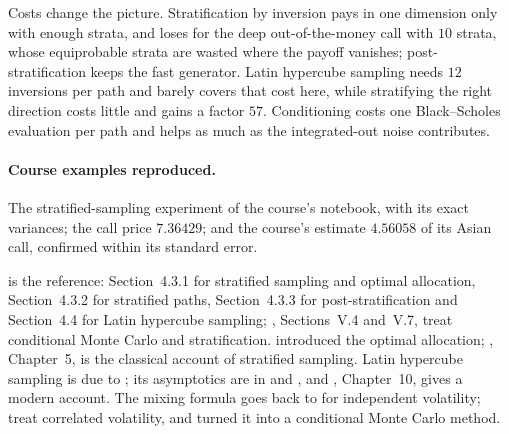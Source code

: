 Costs change the picture. Stratification by inversion pays in one dimension only with enough
strata, and loses for the deep out-of-the-money call with $10$ strata, whose equiprobable strata
are wasted where the payoff vanishes; post-stratification keeps the fast generator. Latin
hypercube sampling needs $12$ inversions per path and barely covers that cost here, while
stratifying the right direction costs little and gains a factor $57$. Conditioning costs one
Black--Scholes evaluation per path and helps as much as the integrated-out noise contributes.

\paragraph{Course examples reproduced.} The stratified-sampling experiment of the course's
notebook, with its exact variances; the call price $7.36429$; and the course's estimate
$4.56058$ of its Asian call, confirmed within its standard error.

\furtherreading
\textcite{glasserman-mc} is the reference: Section~4.3.1 for stratified sampling and optimal
allocation, Section~4.3.2 for stratified paths, Section~4.3.3 for post-stratification and
Section~4.4 for Latin hypercube sampling; \textcite{asmussen-glynn}, Sections~V.4 and~V.7,
treat conditional Monte Carlo and stratification. \textcite{neyman-1934} introduced the optimal
allocation; \textcite{cochran}, Chapter~5, is the classical account of stratified sampling. Latin hypercube sampling is due to \textcite{mckay-beckman-conover}; its asymptotics
are in \textcite{stein-lhs} and \textcite{owen-lhs-clt}, and \textcite{owen-mcbook},
Chapter~10, gives a modern account. The mixing formula goes back to \textcite{hull-white-sv}
for independent volatility; \textcite{romano-touzi} treat correlated volatility, and
\textcite{willard} turned it into a conditional Monte Carlo method.
